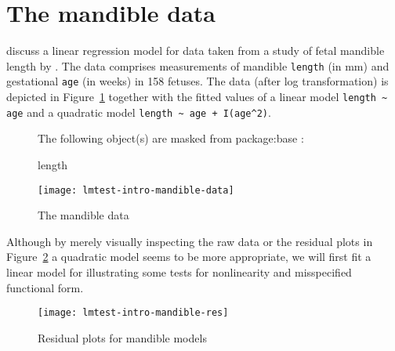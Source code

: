 \documentclass[a4paper]{article}
\begin{document}
\section{The mandible data} \label{sec:mandible}

\cite{lmtest:Royston+Altman:1994}
discuss a linear regression model for data taken from
a study of fetal mandible length by \cite{lmtest:Chitty+Campbell+Altman:1993}.
The data comprises measurements of mandible \texttt{length} (in mm)
and gestational \texttt{age} (in weeks) in 158 fetuses.
The data (after log transformation) is depicted in Figure~\ref{mandible-data}
together with the fitted values of a linear model \verb/length ~ age/
and a quadratic model \verb/length ~ age + I(age^2)/.


\begin{figure}[htbp]
\begin{center}
\begin{Schunk}
\begin{Soutput}
	The following object(s) are masked from package:base :

	 length 
\end{Soutput}
\end{Schunk}
\texttt{[image: lmtest-intro-mandible-data]}
\caption{\label{mandible-data} The mandible data}
\end{center}
\end{figure}

Although by merely visually inspecting the raw data
or the residual plots in Figure~\ref{mandible-res} a quadratic model
seems to be more appropriate, we will first fit a linear model for illustrating
some tests for nonlinearity and misspecified functional form.

\begin{figure}[htbp]
\begin{center}
\texttt{[image: lmtest-intro-mandible-res]}
\caption{\label{mandible-res} Residual plots for mandible models}
\end{center}
\end{figure}
\end{document}
